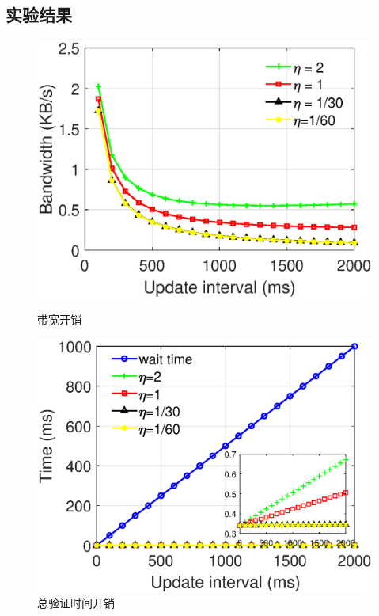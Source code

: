 \subsection{实验结果}
\label{sec:experiments}
\begin{figure}[ht]
  \begin{minipage}[b]{0.49\textwidth}
    \includegraphics[width= 3 in]{expr/bandwidth}
    \caption{带宽开销}
    \label{fig:bandwidth}
  \end{minipage}
  \begin{minipage}[b]{0.49\textwidth}
    \includegraphics[width= 3 in]{expr/verify-2}
    \caption{总验证时间开销}
    \label{fig:verify-2}
  \end{minipage}
\centering
\end{figure}

